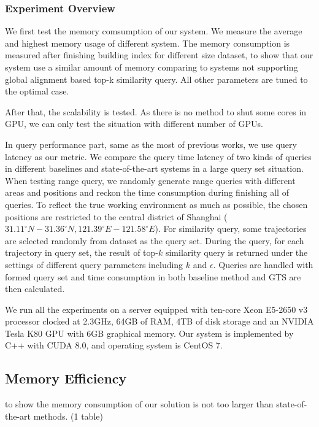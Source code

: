 \documentclass[conference]{IEEEtran}
\begin{document}
\subsubsection{Experiment Overview}

We first test the memory comsumption of our system. We measure the average and highest memory usage of different system. The memory consumption is measured after finishing building index for different size dataset, to show that our system use a similar amount of memory comparing to systems not supporting global alignment based top-k similarity query. All other parameters are tuned to the optimal case.

After that, the scalability is tested. As there is no method to shut some cores in GPU, we can only test the situation with different number of GPUs.

In query performance part, same as the most of previous works, we use query latency as our metric. We compare the query time latency of two kinds of queries in different baselines and state-of-the-art systems in a large query set situation. When testing range query, we randomly generate range queries with different areas and positions and reckon the time consumption during finishing all of queries. To reflect the true working environment as much as possible, the chosen positions are restricted to the central district of Shanghai ($31.11^{\circ} N-31.36^{\circ} N, 121.39^{\circ} E-121.58^{\circ} E$). For similarity query, some trajectories are selected randomly from dataset as the query set. During the query, for each trajectory in query set, the result of top-$k$ similarity query is returned under the settings of different query parameters including $k$ and $\epsilon$. Queries are handled with formed query set and time consumption in both baseline method and GTS are then calculated. 


We run all the experiments on a server equipped with ten-core Xeon E5-2650 v3 processor clocked at 2.3GHz, 64GB of RAM, 4TB of disk storage and an NVIDIA Tesla K80 GPU with 6GB graphical memory. Our system is implemented by C++ with CUDA 8.0, and operating system is CentOS 7.



\subsection{Memory Efficiency}
to show the memory consumption of our solution is not too larger than state-of-the-art methods.
(1 table)
\end{document}
